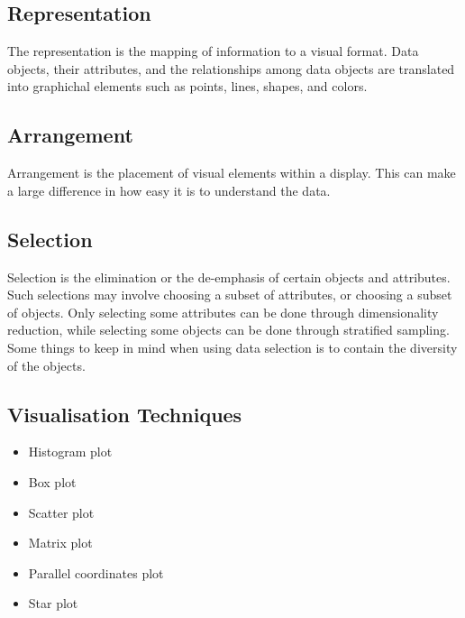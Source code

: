 \subsection{Representation}
The representation is the mapping of information to a visual format. Data objects, their attributes, and the relationships among data objects are translated into graphichal elements such as points, lines, shapes, and colors.

\subsection{Arrangement}
Arrangement is the placement of visual elements within a display. This can make a large difference in how easy it is to understand the data.

\subsection{Selection}
Selection is the elimination or the de-emphasis of certain objects and attributes.
Such selections may involve choosing a subset of attributes, or choosing a subset of objects. Only selecting some attributes can be done through dimensionality reduction, while selecting some objects can be done through stratified sampling.
Some things to keep in mind when using data selection is to contain the diversity of the objects.

\subsection{Visualisation Techniques}
\begin{itemize}
    \item Histogram plot
    \item Box plot
    \item Scatter plot
    \item Matrix plot
    \item Parallel coordinates plot
    \item Star plot
\end{itemize}
